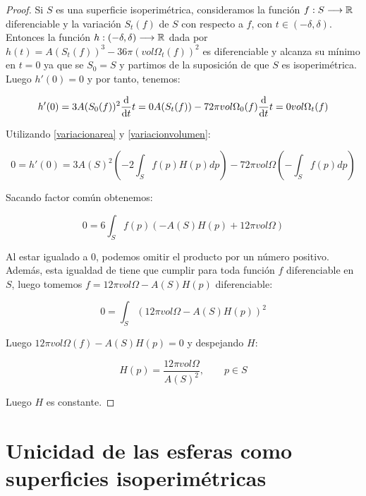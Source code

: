 \begin{proof}
Si $S$ es una superficie isoperimétrica, consideramos la función $f: S \longrightarrow \mathbb{R}$ diferenciable y la variación $S_t(f)$ de $S$ con respecto a $f$, con $t \in (-\delta, \delta)$. Entonces la función $h: (-\delta, \delta) \longrightarrow \mathbb{R}$ dada por $h(t) = A(S_t(f))^3 - 36\pi(vol \Omega_t(f))^2$ es diferenciable y alcanza su mínimo en $t=0$ ya que se $S_0=S$ y partimos de la suposición de que $S$ es isoperimétrica. Luego $h'(0)=0$ y por tanto, tenemos:

\begin{equation*}
    h'(0) = 3A(S_0(f))^2 \diff{}{t}{t=0} A(S_t(f)) - 72\pi vol \Omega_0(f) \diff{}{t}{t=0} vol \Omega_t(f)
\end{equation*}

Utilizando \autoref{variacionarea} y \autoref{variacionvolumen}:

\begin{equation*}
    0 = h'(0) = 3A(S)^2 \left( -2 \int_S f(p)H(p)dp \right) - 72\pi vol \Omega \left( - \int_S f(p) dp \right)
\end{equation*}

Sacando factor común obtenemos:

\begin{equation*}
    0 = 6 \int_S f(p)(-A(S)H(p) + 12 \pi vol \Omega)
\end{equation*}

Al estar igualado a 0, podemos omitir el producto por un número positivo. Además, esta igualdad de tiene que cumplir para toda función $f$ diferenciable en $S$, luego tomemos $f = 12 \pi vol \Omega - A(S)H(p)$ diferenciable:

\begin{equation*}
    0 = \int_S (12 \pi vol \Omega - A(S)H(p))^2
\end{equation*}

Luego $12 \pi vol \Omega(f) - A(S)H(p) = 0$ y despejando $H$:

\begin{equation*}
    H(p) = \frac{12 \pi vol \Omega}{A(S)^2}, \qquad p \in S
\end{equation*}


Luego $H$ es constante.
\end{proof}

\section{Unicidad de las esferas como superficies isoperimétricas}

